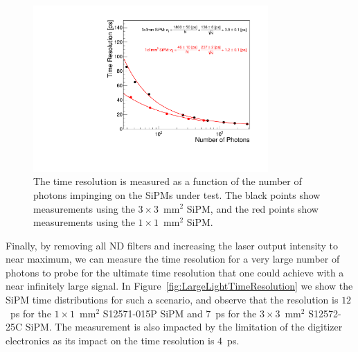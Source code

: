 \begin{figure}[htbp] 
\centering
\includegraphics[width=0.8\textwidth]{figures/TimeResolutionVsNPhotons.pdf}
\caption{ The time resolution is measured as a function of the number of photons 
impinging on the SiPMs under test. The black points show measurements using the
$3\times3$~$\mathrm{mm}^{2}$ SiPM, and the red points show measurements
using the $1\times1$~$\mathrm{mm}^{2}$ SiPM. \label{fig:TimeResolutionVsNPhotons}
} 
\end{figure} 


Finally, by removing all ND filters and increasing the laser output intensity to near 
maximum, we can measure the time resolution for a very large number of photons 
to probe for the ultimate time resolution that one could achieve with a near 
infinitely large signal. In Figure~\ref{fig:LargeLightTimeResolution} we show 
the SiPM time distributions for such a scenario, and observe that the resolution 
is $12$~ps for the $1\times1$~$\mathrm{mm}^{2}$  S12571-015P SiPM and
$7$~ps for the $3\times 3$~$\mathrm{mm}^{2}$ S12572-25C SiPM. 
The measurement is also impacted by the limitation
of the digitizer electronics as its impact on the time resolution is $4$~ps. 

